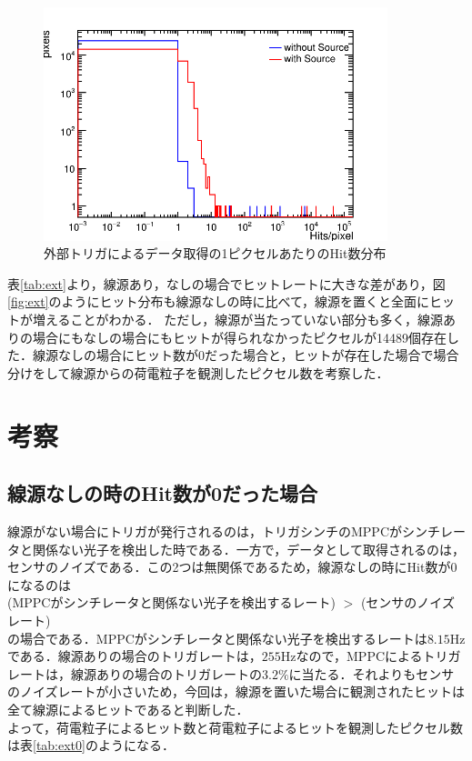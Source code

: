 \begin{figure}[h]
  \centering
  \includegraphics[width=10cm]{./figure/extperpix.png}
  \caption{外部トリガによるデータ取得の1ピクセルあたりのHit数分布}
  \label{fig:selfhitfreq}
\end{figure}

表\ref{tab:ext}より，線源あり，なしの場合でヒットレートに大きな差があり，図\ref{fig:ext}のようにヒット分布も線源なしの時に比べて，線源を置くと全面にヒットが増えることがわかる．
ただし，線源が当たっていない部分も多く，線源ありの場合にもなしの場合にもヒットが得られなかったピクセルが14489個存在した．線源なしの場合にヒット数が0だった場合と，ヒットが存在した場合で場合分けをして線源からの荷電粒子を観測したピクセル数を考察した．

\section{考察}
\label{sec:extsum}
\subsection*{線源なしの時のHit数が0だった場合}
線源がない場合にトリガが発行されるのは，トリガシンチのMPPCがシンチレータと関係ない光子を検出した時である．一方で，データとして取得されるのは，センサのノイズである．この2つは無関係であるため，線源なしの時にHit数が0になるのは\\

(MPPCがシンチレータと関係ない光子を検出するレート) $>$ (センサのノイズレート)\\

の場合である．MPPCがシンチレータと関係ない光子を検出するレートは$8.15 \mathrm{Hz}$である．線源ありの場合のトリガレートは，$255 \mathrm{Hz}$なので，MPPCによるトリガレートは，線源ありの場合のトリガレートの$3.2 \mathrm{\%}$に当たる．それよりもセンサのノイズレートが小さいため，今回は，線源を置いた場合に観測されたヒットは全て線源によるヒットであると判断した．\\
よって，荷電粒子によるヒット数と荷電粒子によるヒットを観測したピクセル数は表\ref{tab:ext0}のようになる．

